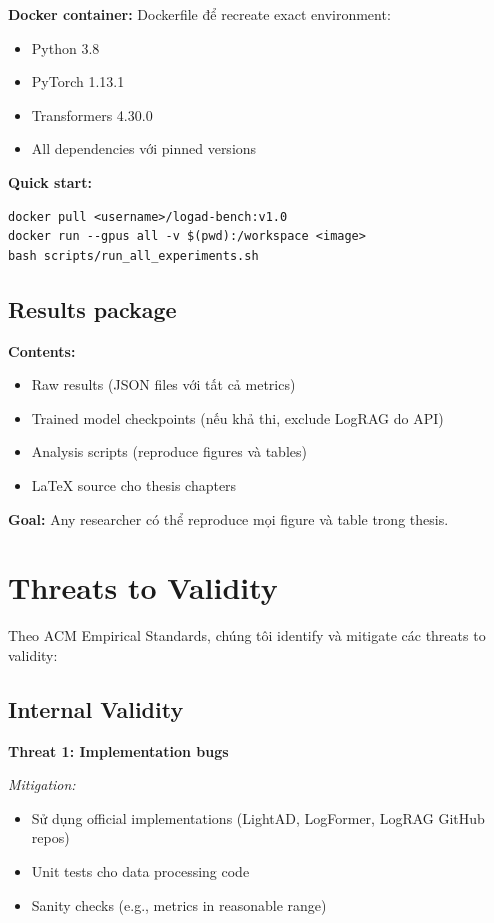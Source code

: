 \textbf{Docker container:} Dockerfile để recreate exact environment:
\begin{itemize}
    \item Python 3.8
    \item PyTorch 1.13.1
    \item Transformers 4.30.0
    \item All dependencies với pinned versions
\end{itemize}

\textbf{Quick start:}
\begin{verbatim}
docker pull <username>/logad-bench:v1.0
docker run --gpus all -v $(pwd):/workspace <image>
bash scripts/run_all_experiments.sh
\end{verbatim}

\subsection{Results package}

\textbf{Contents:}
\begin{itemize}
    \item Raw results (JSON files với tất cả metrics)
    \item Trained model checkpoints (nếu khả thi, exclude LogRAG do API)
    \item Analysis scripts (reproduce figures và tables)
    \item LaTeX source cho thesis chapters
\end{itemize}

\textbf{Goal:} Any researcher có thể reproduce mọi figure và table trong thesis.

\section{Threats to Validity}
\label{sec:threats-to-validity}

Theo ACM Empirical Standards, chúng tôi identify và mitigate các threats to validity:

\subsection{Internal Validity}

\textbf{Threat 1: Implementation bugs}

\textit{Mitigation:}
\begin{itemize}
    \item Sử dụng official implementations (LightAD, LogFormer, LogRAG GitHub repos)
    \item Unit tests cho data processing code
    \item Sanity checks (e.g., metrics in reasonable range)
\end{itemize}

